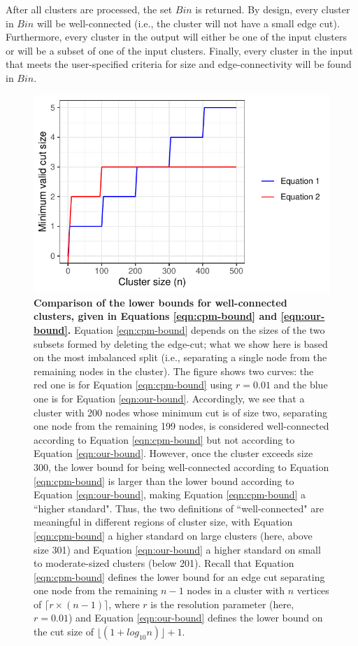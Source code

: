 \documentclass[11pt]{article}   	%
\begin{document}
After all clusters are processed, the set $Bin$ is returned.
By design, every cluster in  $Bin$ will be well-connected (i.e., the cluster will not have a small edge cut).
Furthermore, every cluster in the output will either be one of the input clusters or will be a subset of one of the input clusters.
Finally, every cluster in the input that meets the user-specified criteria for size and edge-connectivity will be found in $Bin$.

\begin{figure}[H]
\centering
\includegraphics[width=0.7\linewidth]{figs/well_connected_definition.pdf}
\caption{\textbf{Comparison of  the  lower bounds for well-connected clusters,  given in Equations \ref{eqn:cpm-bound} and \ref{eqn:our-bound}.}
Equation \ref{eqn:cpm-bound} depends on the sizes of the two subsets formed by deleting the edge-cut; what we show here is based on the most imbalanced split (i.e., separating a single node from the remaining nodes in the cluster).
The figure shows two curves: the red one is for Equation \ref{eqn:cpm-bound} using $r=0.01$ and the blue one is for Equation \ref{eqn:our-bound}.
Accordingly, we see that a cluster with 200 nodes whose minimum cut is of size two, separating one node from the remaining 199 nodes, is considered well-connected
according to Equation \ref{eqn:cpm-bound}  but not according to Equation \ref{eqn:our-bound}.  However, once the cluster exceeds size 300, the lower bound for being well-connected according to
Equation \ref{eqn:cpm-bound}   is larger than the lower bound according to Equation \ref{eqn:our-bound}, making
Equation \ref{eqn:cpm-bound} a ``higher standard".
Thus, the two definitions of ``well-connected"  are meaningful in different
regions of cluster size, with Equation \ref{eqn:cpm-bound}  a higher standard on large clusters (here, above size 301) and Equation \ref{eqn:our-bound}   a higher standard on small to moderate-sized clusters (below 201).
Recall that Equation \ref{eqn:cpm-bound}  defines the lower bound for an edge cut separating one node from the remaining $n-1$ nodes
  in a cluster with $n$ vertices of $\lceil r \times (n-1) \rceil$, where $r$ is the resolution parameter (here, $r=0.01$)
and Equation \ref{eqn:our-bound} defines the lower bound on the cut size of $\lfloor(1 + log_{10}n)\rfloor +1$.}
\end{figure}
\end{document}

